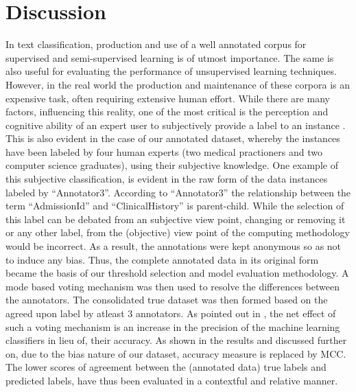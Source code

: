 \documentclass{ieeeaccess}
\begin{document}
\section{Discussion}
\label{discussion}
In text classification, production and use of a well annotated corpus for supervised and semi-supervised learning is of utmost importance. The same is also useful for evaluating the performance of unsupervised learning techniques. However, in the real world the production and maintenance of these corpora is an expensive task, often requiring extensive human effort. While there are many factors, influencing this reality, one of the most critical is the perception and cognitive ability of an expert user to subjectively provide a label to an instance \cite{reidsma2008exploiting, velupillai2010towards}. This is also evident in the case of our annotated dataset, whereby the instances have been labeled by four human experts (two medical practioners and two computer science graduates), using their subjective knowledge. One example of this subjective classification, is evident in the raw form of the data instances labeled by ``Annotator3''. According to ``Annotator3'' the relationship between the term ``AdmissionId'' and ``ClinicalHistory'' is parent-child. While the selection of this label can be debated from an subjective view point, changing or removing it or any other label, from the (objective) view point of the computing methodology would be incorrect\cite{pavlick2019inherent}. As a result, the annotations were kept anonymous so as not to induce any bias. Thus, the complete annotated data in its original form became the basis of our threshold selection and model evaluation methodology. A mode based voting mechanism was then used to resolve the differences between the annotators. The consolidated true dataset was then formed based on the agreed upon label by atleast 3 annotators. As pointed out in \cite{reidsma2008exploiting}, the net effect of such a voting mechanism is an increase in the precision of the machine learning classifiers in lieu of, their accuracy. As shown in the results and discussed further on, due to the bias nature of our dataset, accuracy measure is replaced by MCC. The lower scores of agreement between the (annotated data) true labels and predicted labels, have thus been evaluated in a contextful and relative manner.
\end{document}
